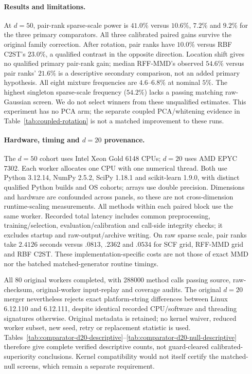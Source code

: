 {\paragraph{Results and limitations.}
At $d=50$, pair-rank sparse-scale power is $41.0\%$ versus
$10.6\%$, $7.2\%$ and $9.2\%$ for the three primary comparators.
All three calibrated paired gains survive the original family correction.
After rotation, pair ranks have $10.0\%$ versus RBF C2ST's $23.0\%$,
a qualified contrast in the opposite direction. Location shift gives no
qualified primary pair-rank gain; median RFF-MMD's observed $54.6\%$ versus
pair ranks' $21.6\%$ is a descriptive secondary comparison, not an added primary
hypothesis. All eight mixture frequencies are $4.6$--$6.8\%$ at nominal $5\%$.
The highest singleton sparse-scale frequency ($54.2\%$) lacks a passing matching
raw-Gaussian screen. We do not select winners from these unqualified estimates.
This experiment has no PCA arm; the separate coupled PCA/whitening evidence
in Table~\ref{tab:coupled-rotation} is not a matched improvement to these runs.

\paragraph{Hardware, timing and $d=20$ provenance.}
The $d=50$ cohort uses Intel Xeon Gold 6148 CPUs; $d=20$ uses AMD EPYC 7302.
Each worker allocates one CPU with one numerical thread. Both use Python 3.12.14,
NumPy 2.5.2, SciPy 1.18.1 and scikit-learn 1.9.0, with distinct qualified Python
builds and OS cohorts; arrays use double precision. Dimensions and hardware
are confounded across panels, so these are not cross-dimension runtime-scaling
measurements. All methods within each paired block use the same worker.
Recorded total latency includes common preprocessing, training/selection,
evaluation/calibration and call-side integrity checks; it excludes startup
and raw-output/archive writing. On raw sparse scale, pair ranks take $2.4126$
seconds versus $.0813$, $.2362$ and $.0534$ for SCF grid, RFF-MMD grid and
RBF C2ST. These implementation-specific costs are not those of exact MMD nor the batched matched-generator routine timings.

All 80 original workers completed, with 288000 method calls passing source,
raw-checksum, original-worker input-replay and coverage audits.
The original $d=20$ merger nevertheless rejects exact platform-string differences
between Linux 6.12.110 and 6.12.111, despite identical recorded CPU/software
and threading signatures otherwise. Original metadata is retained; no kernel
waiver, reduced worker subset, new seed, retry or replacement statistic is used.
Tables~\ref{tab:comparator-d20-descriptive}--\ref{tab:comparator-d20-null-descriptive}
therefore give complete verified descriptive counts, not guard-cleared
calibrated-superiority conclusions. Kernel compatibility would not itself
certify the matched-null screens, which remain a separate requirement.

}
